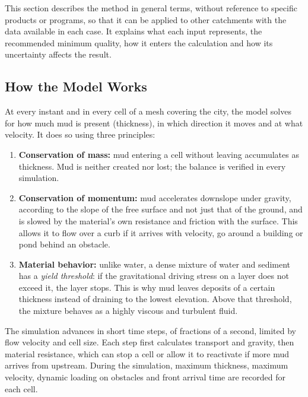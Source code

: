 This section describes the method in general terms, without reference to specific products or programs, so that it can be applied to other catchments with the data available in each case. It explains what each input represents, the recommended minimum quality, how it enters the calculation and how its uncertainty affects the result.

\subsection*{How the Model Works}
At every instant and in every cell of a mesh covering the city, the model solves for how much mud is present (thickness), in which direction it moves and at what velocity. It does so using three principles:
\begin{enumerate}
\item \textbf{Conservation of mass:} mud entering a cell without leaving accumulates as thickness. Mud is neither created nor lost; the balance is verified in every simulation.
\item \textbf{Conservation of momentum:} mud accelerates downslope under gravity, according to the slope of the free surface and not just that of the ground, and is slowed by the material's own resistance and friction with the surface. This allows it to flow over a curb if it arrives with velocity, go around a building or pond behind an obstacle.
\item \textbf{Material behavior:} unlike water, a dense mixture of water and sediment has a \emph{yield threshold}: if the gravitational driving stress on a layer does not exceed it, the layer stops. This is why mud leaves deposits of a certain thickness instead of draining to the lowest elevation. Above that threshold, the mixture behaves as a highly viscous and turbulent fluid.
\end{enumerate}
The simulation advances in short time steps, of fractions of a second, limited by flow velocity and cell size. Each step first calculates transport and gravity, then material resistance, which can stop a cell or allow it to reactivate if more mud arrives from upstream. During the simulation, maximum thickness, maximum velocity, dynamic loading on obstacles and front arrival time are recorded for each cell.

